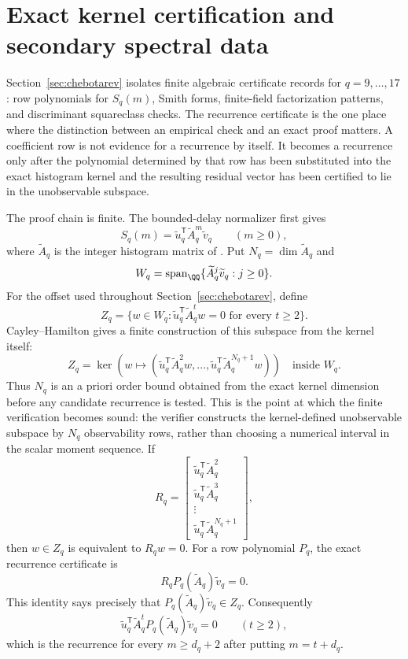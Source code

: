 ﻿%
\section{Exact kernel certification and secondary spectral data}
\label{app:certification}

Section~\ref{sec:chebotarev} isolates finite algebraic certificate records for
\(q=9,\dots,17\): row polynomials for \(S_q(m)\), Smith forms, finite-field
factorization patterns, and discriminant squareclass checks.  The recurrence
certificate is the one place where the distinction between an empirical check
and an exact proof matters.  A coefficient row is not evidence for a recurrence
by itself.  It becomes a recurrence only after the polynomial determined by that
row has been substituted into the exact histogram kernel and the resulting
residual vector has been certified to lie in the unobservable subspace.

The proof chain is finite.  The bounded-delay normalizer first gives
\[
  S_q(m)=\widetilde u_q^{\mathsf T}\widetilde A_q^m\widetilde v_q
  \qquad(m\ge0),
\]
where \(\widetilde A_q\) is the integer histogram matrix of
.  Put \(N_q=\dim\widetilde A_q\) and
\[
  W_q=\operatorname{span}_{\QQ}
  \{\widetilde A_q^j\widetilde v_q:j\ge0\}.
\]
For the offset used throughout Section~\ref{sec:chebotarev}, define
\[
  Z_q=
  \{w\in W_q:\widetilde u_q^{\mathsf T}\widetilde A_q^t w=0
    \text{ for every }t\ge2\}.
\]
Cayley--Hamilton gives a finite construction of this subspace from the kernel
itself:
\[
  Z_q=
  \ker\!\left(
  w\mapsto
  (\widetilde u_q^{\mathsf T}\widetilde A_q^2w,\dots,
   \widetilde u_q^{\mathsf T}\widetilde A_q^{N_q+1}w)
  \right)
  \quad\text{inside }W_q.
\]
Thus \(N_q\) is an a priori order bound obtained from the exact kernel dimension
before any candidate recurrence is tested.  This is the point at which the
finite verification becomes sound: the verifier constructs the kernel-defined
unobservable subspace by \(N_q\) observability rows, rather than choosing a
numerical interval in the scalar moment sequence.
If
\[
  R_q=
  \begin{bmatrix}
  \widetilde u_q^{\mathsf T}\widetilde A_q^2\\
  \widetilde u_q^{\mathsf T}\widetilde A_q^3\\
  \vdots\\
  \widetilde u_q^{\mathsf T}\widetilde A_q^{N_q+1}
  \end{bmatrix},
\]
then \(w\in Z_q\) is equivalent to \(R_qw=0\).  For a row polynomial \(P_q\), the
exact recurrence certificate is
\begin{equation}
\label{eq:primary-residual-certificate}
  R_qP_q(\widetilde A_q)\widetilde v_q=0.
\end{equation}
This identity says precisely that
\(P_q(\widetilde A_q)\widetilde v_q\in Z_q\).  Consequently
\[
  \widetilde u_q^{\mathsf T}\widetilde A_q^t
  P_q(\widetilde A_q)\widetilde v_q=0\qquad(t\ge2),
\]
which is the recurrence for every \(m\ge d_q+2\) after putting \(m=t+d_q\).

